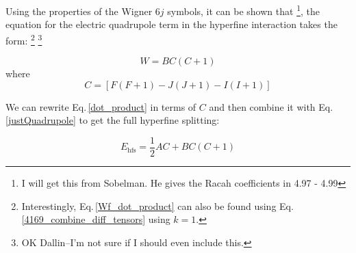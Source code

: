 Using the properties of the Wigner $6j$ symbols, it can be shown that \footnote{I will get this from Sobelman. He gives the Racah coefficients in 4.97 - 4.99}, the equation for the electric quadrupole term in the hyperfine interaction takes the form:
\footnote{Interestingly, Eq.\,\ref{Wf_dot_product} can also be found using Eq.\,\ref{4169_combine_diff_tensors} using $k=1$.}
\footnote{OK Dallin--I'm not sure if I should even include this.} 

\begin{equation}\label{justQuadrupole}
W=BC(C+1)
\end{equation}
where 
\begin{equation}
C=[F(F+1)-J(J+1)-I(I+1)]
\end{equation}

We can rewrite Eq.\,\ref{dot_product} in terms of $C$ and then combine it with Eq.\,\ref{justQuadrupole} to get the full hyperfine splitting: 

\begin{equation}\label{Standard_hyperfine_AB}
E_{\mathrm{hfs}}=\frac{1}{2}AC+BC(C+1)
\end{equation}

\cite{cuaMITnotes}

